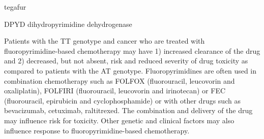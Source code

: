 \documentclass{resume} %
\begin{document}
\begin{rSection}{ tegafur }
\begin{rSubsection}{ DPYD }{ dihydropyrimidine dehydrogenase }{}{}
\item[] Patients with the TT genotype and cancer who are treated with fluoropyrimidine-based chemotherapy may have 1) increased clearance of the drug and 2) decreased, but not absent, risk and reduced severity of drug toxicity as compared to patients with the AT genotype. Fluoropyrimidines are often used in combination chemotherapy such as FOLFOX (fluorouracil, leucovorin and oxaliplatin), FOLFIRI (fluorouracil, leucovorin and irinotecan) or FEC (fluorouracil, epirubicin and cyclophosphamide) or with other drugs such as bevacizumab, cetuximab, raltitrexed. The combination and delivery of the drug may influence risk for toxicity. Other genetic and clinical factors may also influence response to fluoropyrimidine-based chemotherapy.

\end{rSubsection}


\end{rSection}
\end{document}

